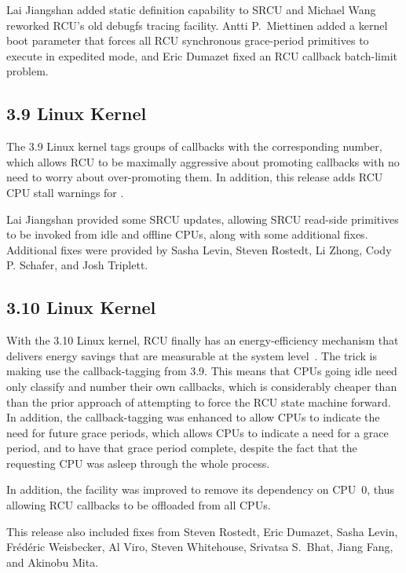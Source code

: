 Lai Jiangshan added static definition capability to SRCU and Michael
Wang reworked RCU's old debugfs tracing facility.
Antti P.~Miettinen added a kernel boot parameter that forces all RCU
synchronous grace-period primitives to execute in expedited mode,
and Eric Dumazet fixed an RCU callback batch-limit problem.

\subsection{3.9 Linux Kernel}

The 3.9 Linux kernel tags groups of callbacks with the corresponding
number, which allows RCU to be maximally aggressive about promoting
callbacks with no need to worry about over-promoting them.
In addition, this release adds RCU CPU stall warnings for .

Lai Jiangshan provided some SRCU updates, allowing SRCU read-side primitives
to be invoked from idle and offline CPUs, along with some additional
fixes.
Additional fixes were provided by Sasha Levin, Steven Rostedt,
Li Zhong, Cody P. Schafer, and Josh Triplett.

\subsection{3.10 Linux Kernel}

With the 3.10 Linux kernel, RCU finally has an energy-efficiency mechanism
that delivers energy savings that are measurable at the system
level~\cite{PaulMcKenney2013AMPenergyHOTPAR}.
The trick is making  use the callback-tagging from
3.9.
This means that CPUs going idle need only classify and number their own
callbacks, which is considerably cheaper than than the prior approach
of attempting to force the RCU state machine forward.
In addition, the callback-tagging was enhanced to allow CPUs to indicate
the need for future grace periods, which allows CPUs to indicate a need
for a grace period, and to have that grace period complete, despite the
fact that the requesting CPU was asleep through the whole process.

In addition, the  facility was improved to
remove its dependency on CPU~0, thus allowing RCU callbacks to be offloaded
from all CPUs.

This release also included fixes from Steven Rostedt, Eric Dumazet,
Sasha Levin, Fr\'ed\'eric Weisbecker, Al Viro, Steven Whitehouse,
Srivatsa S.~Bhat, Jiang Fang, and Akinobu Mita.


